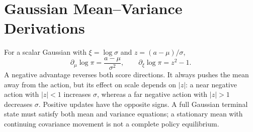 \section{Gaussian Mean--Variance Derivations}
\label{app:gaussian}

For a scalar Gaussian with $\xi=\log\sigma$ and $z=(a-\mu)/\sigma$,
\begin{equation}
\partial_\mu\log\pi=\frac{a-\mu}{\sigma^2},\qquad
\partial_\xi\log\pi=z^2-1.
\end{equation}
A negative advantage reverses both score directions. It always pushes the mean away from the action, but its effect on scale depends on $|z|$: a near negative action with $|z|<1$ increases $\sigma$, whereas a far negative action with $|z|>1$ decreases $\sigma$. Positive updates have the opposite signs. A full Gaussian terminal state must satisfy both mean and variance equations; a stationary mean with continuing covariance movement is not a complete policy equilibrium.

